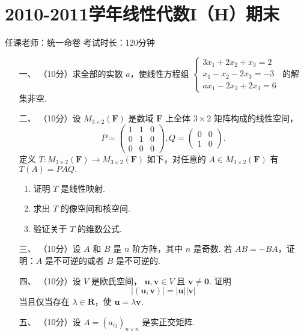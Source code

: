 \section*{2010-2011学年线性代数I（H）期末}

\begin{center}
    任课老师：统一命卷\hspace{4em} 考试时长：120分钟
\end{center}

\begin{enumerate}
    \item [一、]（10分）求全部的实数 $a$，使线性方程组
    $\begin{cases} 3x_1+2x_2+x_3=2 \\ x_1-x_2-2x_3=-3 \\ ax_1-2x_2+2x_3 = 6\end{cases}$ 的解集非空.
    \item [二、]（10分）设 $M_{3\times2} (\mathbf{F})$ 是数域 $\mathbf{F}$ 上全体 $3\times 2$ 矩阵构成的线性空间，
    \[P = \begin{pmatrix}1 & 1 & 0 \\ 0 & 1 & 0 \\ 0 & 0 & 0\end{pmatrix},Q=\begin{pmatrix}0 & 0 \\ 1 & 0\end{pmatrix}.\]
    定义 $T:M_{3\times 2}(\mathbf{F}) \to M_{3\times2} (\mathbf{F})$ 如下，对任意的 $A\in M_{3\times2}(\mathbf{F})$ 有 $T(A) = PAQ.$
    \begin{enumerate}[label=(\arabic*)]
        \item 证明 $T$ 是线性映射.
        \item 求出 $T$ 的像空间和核空间.
        \item 验证关于 $T$ 的维数公式.
    \end{enumerate}
    \item [三、]（10分）设 $A$ 和 $B$ 是 $n$ 阶方阵，其中 $n$ 是奇数. 若 $AB=-BA$，证明：$A$ 是不可逆的或者 $B$ 是不可逆的.
    \item [四、]（10分）设 $V$ 是欧氏空间， $\mathbf{u,v}\in V$ 且 $\mathbf{v} \neq \mathbf{0}.$ 证明
    \[\lvert(\mathbf{u,v}) \rvert =\lvert \mathbf{u} \rvert \lvert \mathbf{v} \rvert \]
    当且仅当存在 $\lambda \in \mathbf{R}$，使 $\mathbf{u} = \lambda \mathbf{v}.$
    \item [五、]（10分）设 $A=(a_{ij})_{n\times n}$ 是实正交矩阵.

\end{enumerate}
